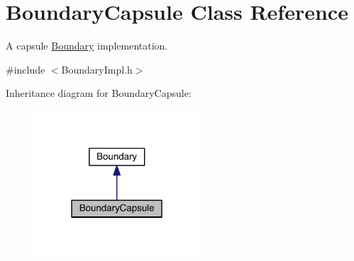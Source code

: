 \hypertarget{classBoundaryCapsule}{\section{Boundary\+Capsule Class Reference}
\label{classBoundaryCapsule}
}


A capsule \hyperlink{classBoundary}{Boundary} implementation.  




{\ttfamily \#include $<$Boundary\+Impl.\+h$>$}



Inheritance diagram for Boundary\+Capsule\+:\nopagebreak
\begin{figure}[H]
\begin{center}
\leavevmode
\includegraphics[width=175pt]{classBoundaryCapsule__inherit__graph}
\end{center}
\end{figure}


